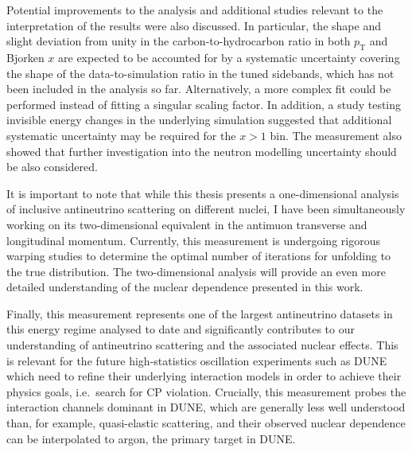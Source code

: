 Potential improvements to the analysis and additional studies relevant to the interpretation of the results were also discussed. In particular, the shape and slight deviation from unity in the carbon-to-hydrocarbon ratio in both $p_{\text{T}}$ and Bjorken $x$ are expected to be accounted for by a systematic uncertainty covering the shape of the data-to-simulation ratio in the tuned sidebands, which has not been included in the analysis so far. Alternatively, a more complex fit could be performed instead of fitting a singular scaling factor. In addition, a study testing invisible energy changes in the underlying simulation suggested that additional systematic uncertainty may be required for the $x > 1 $ bin. The measurement also showed that further investigation into the neutron modelling uncertainty should be also considered. 

It is important to note that while this thesis presents a one-dimensional analysis of inclusive antineutrino scattering on different nuclei, I have been simultaneously working on its two-dimensional equivalent in the antimuon transverse and longitudinal momentum. Currently, this measurement is undergoing rigorous warping studies to determine the optimal number of iterations for unfolding to the true distribution. The two-dimensional analysis will provide an even more detailed understanding of the nuclear dependence presented in this work. 

Finally, this measurement represents one of the largest antineutrino datasets in this energy regime analysed to date and significantly contributes to our understanding of antineutrino scattering and the associated nuclear effects.
This is relevant for the future high-statistics oscillation experiments such as DUNE which need to refine their underlying interaction models in order to achieve their physics goals, i.e.~search for CP violation. Crucially, this measurement probes the interaction channels dominant in DUNE, which are generally less well understood than, for example, quasi-elastic scattering, and their observed nuclear dependence can be interpolated to argon, the primary target in DUNE.





